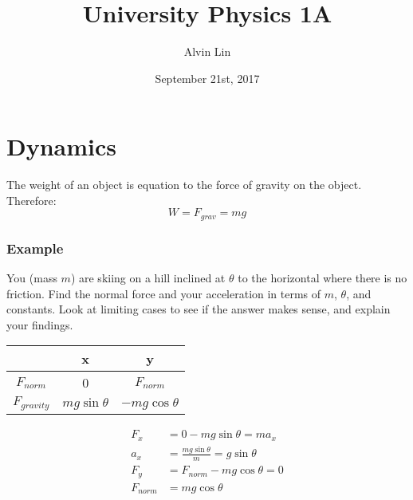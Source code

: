 \documentclass{math}
\title{University Physics 1A}
\author{Alvin Lin}
\date{September 21st, 2017}
\begin{document}
\maketitle

\section*{Dynamics}
The weight of an object is equation to the force of gravity on the object.
Therefore:
\[ W = F_{grav} = mg \]

\subsubsection*{Example}
You (mass \( m \)) are skiing on a hill inclined at \( \theta \) to the
horizontal where there is no friction. Find the normal force and your
acceleration in terms of \( m \), \( \theta \), and constants. Look at limiting
cases to see if the answer makes sense, and explain your findings.
\begin{center}
\end{center}
\begin{center}
  \begin{tabular}{|c|c|c|}
    \hline
    & x & y \\ \hline
    \( F_{norm} \) & 0 & \( F_{norm} \) \\
    \hline
    \( F_{gravity} \) & \( mg\sin\theta \) & \( -mg\cos\theta \) \\ \hline
  \end{tabular}
\end{center}
\begin{align*}
  F_x &= 0-mg\sin\theta = ma_{x} \\
  a_x &= \frac{mg\sin\theta}{m} = g\sin\theta \\
  F_y &= F_{norm}-mg\cos\theta = 0 \\
  F_{norm} &= mg\cos\theta
\end{align*}
\end{document}

